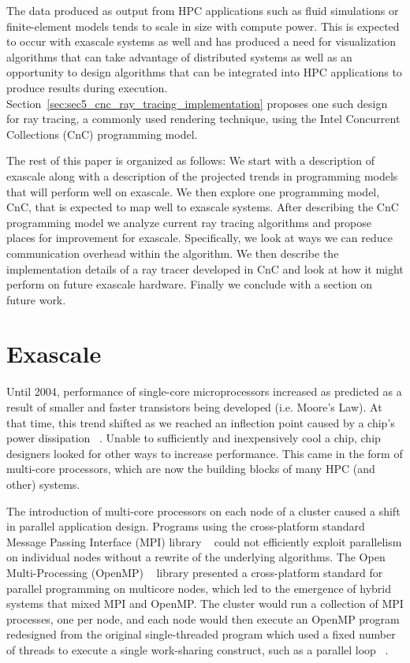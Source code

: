 The data produced as output from HPC applications such as fluid
simulations or finite-element models tends to scale in size with
compute power. This is expected to occur with exascale systems as well
and has produced a need for visualization algorithms that can take
advantage of distributed systems as well as an opportunity to design
algorithms that can be integrated into HPC applications to produce
results during execution. Section~\ref{sec:sec5_cnc_ray_tracing_implementation} 
proposes one such design for ray tracing, a commonly used rendering technique,
using the Intel Concurrent Collections (CnC) programming model.

The rest of this paper is organized as follows: We start with a description of 
exascale along with a description of the projected trends in programming models 
that will perform well on exascale.  We then explore one programming model, CnC, 
that is expected to map well to exascale systems.  After describing the CnC 
programming model we analyze current ray tracing algorithms and propose places 
for improvement for exascale.  Specifically, we look at ways we can reduce 
communication overhead within the algorithm.  We then describe the 
implementation details of a ray tracer developed in CnC and look at how it might 
perform on future exascale hardware.  Finally we conclude with a section on 
future work.

\section{Exascale}
\label{sec:exascale}

Until 2004, performance of single-core microprocessors increased as
predicted as a result of smaller and faster transistors being
developed (i.e. Moore's Law). At that time, this trend shifted as we
reached an inflection point caused by a chip’s power dissipation
~\cite{kogge2013exascale}. Unable to sufficiently and inexpensively
cool a chip, chip designers looked for other ways to increase
performance. This came in the form of multi-core processors, which are
now the building blocks of many HPC (and other) systems.

The introduction of multi-core processors on each node of a cluster
caused a shift in parallel application design. Programs using the
cross-platform standard Message Passing Interface (MPI) library
~\cite{Snir:1998:MCR:552013} could not efficiently exploit parallelism
on individual nodes without a rewrite of the underlying algorithms.
The Open Multi-Processing (OpenMP) ~\cite{openmp08} library presented
a cross-platform standard for parallel programming on multicore nodes,
which led to the emergence of hybrid systems that mixed MPI and
OpenMP. The cluster would run a collection of MPI processes, one per
node, and each node would then execute an OpenMP program redesigned
from the original single-threaded program which used a fixed number of
threads to execute a single work-sharing construct, such as a parallel
loop ~\cite{gropp2013programming}.

